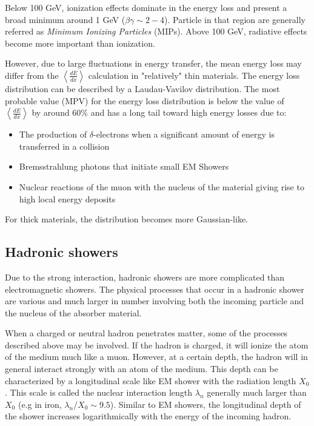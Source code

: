 Below 100 GeV, ionization effects dominate in the energy loss and present a broad minimum around 1 GeV ($\beta\gamma \sim 2-4$). Particle in that region are generally referred as \textit{Minimum Ionizing Particles} (MIPs). Above 100 GeV, radiative effects become more important than ionization.

However, due to large fluctuations in energy transfer, the mean energy loss may differ from the $\left<\frac{dE}{dx}\right>$ calculation in "relatively" thin materials. The energy loss distribution can be described by a Laudau-Vavilov distribution. The most probable value (MPV) for the energy loss distribution is below the value of $\left<\frac{dE}{dx}\right>$ by around 60\% and has a long tail toward high energy losses due to:
\begin{itemize}
  \item The production of $\delta$-electrons when a significant amount of energy is transferred in a collision
  \item Bremsstrahlung photons that initiate small EM Showers
  \item Nuclear reactions of the muon with the nucleus of the material giving rise to high local energy deposits
\end{itemize}
For thick materials, the distribution becomes more Gaussian-like.

\subsection{Hadronic showers}
\label{subsec:HadShowers}

Due to the strong interaction, hadronic showers are more complicated than electromagnetic showers. The physical processes that occur in a hadronic shower are various and much larger in number involving both the incoming particle and the nucleus of the absorber material.

When a charged or neutral hadron penetrates matter, some of the processes described above may be involved. If the hadron is charged, it will ionize the atom of the medium much like a muon. However, at a certain depth, the hadron will in general interact strongly with an atom of the medium. This depth can be characterized by a longitudinal scale like EM shower with the radiation length $X_0$. This scale is called the nuclear interaction length $\lambda_n$ generally much larger than $X_0$ (e.g in iron, $\lambda_n/X_0 \sim 9.5$). Similar to EM showers, the longitudinal depth of the shower increases logarithmically with the energy of the incoming hadron.

